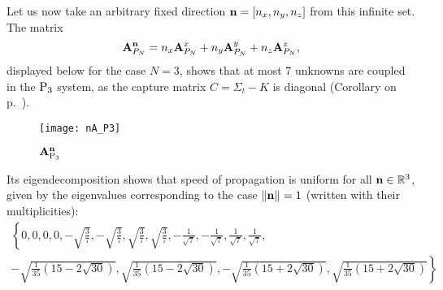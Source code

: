 Let us now take an arbitrary fixed direction $\bn = [n_x,n_y,n_z]$ from this infinite set. 
The matrix
$$
	\mat{A}_{P_N}^{\bn} = n_x \mat{A}_{P_N}^x + n_y \mat{A}_{P_N}^y + n_z \mat{A}_{P_N}^z,
$$
displayed below for the case $N = 3$, shows that at most 7 unknowns are coupled in the $\PN[3]$ system, as the
capture matrix $C = \Sigma_t - K$ is diagonal (Corollary \label{cor:capture} on p.~\pageref{cor:capture}).

\begin{figure}[htb]
\hspace*{-1.1cm}
  \texttt{[image: nA\_P3]}
  \caption{$\mat{A}_{\PN[3]}^{\bn}$}
  \label{fig:nAP3}
\end{figure}

Its eigendecomposition
shows that speed of propagation is uniform for all $\bn\in\R[3]$, given by the eigenvalues corresponding to the case
$\norm{\bn} = 1$ (written with their multiplicities):
$$
\begin{multlined}
\textstyle
\left\{0,0,0,0,-\sqrt{\frac{3}{7}},-\sqrt{\frac{3}{7}},\sqrt{\frac{3}{7}},\sqrt{\frac{3}{7}},-\frac{1}{\sqrt{7}},
-\frac{1}{\sqrt{7}},\frac{1}{\sqrt{7}},\frac{1}{\sqrt{7}},\right.\\
\textstyle
\left.-\sqrt{\frac{1}{35} \left(15-2 \sqrt{30}\right)},
\sqrt{\frac{1}{35} \left(15-2 \sqrt{30}\right)},-\sqrt{\frac{1}{35} \left(15+2 \sqrt{30}\right)},\sqrt{\frac{1}{35} 
\left(15+2 \sqrt{30}\right)}\right\}
\end{multlined} 
$$

